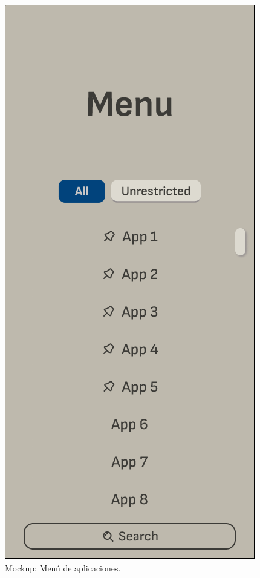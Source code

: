 \begin{figure}[H]
  \centering
  \begin{minipage}{0.48\textwidth}
    \caption{Mockup: Menú de aplicaciones.}
    \label{fig:mockup_menu_aplicaciones}
    \includegraphics[width=\textwidth]{Figuras/mockup_3.png}

\end{minipage}
\end{figure}
